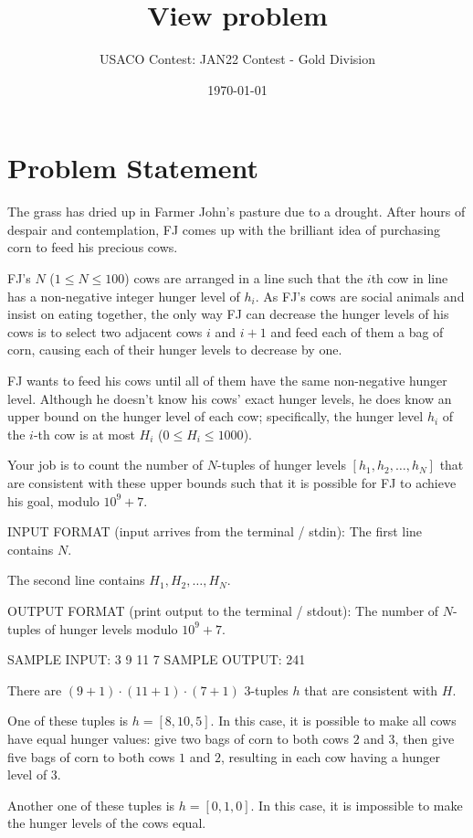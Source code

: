\documentclass[12pt]{article}
\title{View problem}
\author{USACO Contest: JAN22 Contest - Gold Division}
\date{\today}
\begin{document}
\maketitle

\section*{Problem Statement}

The grass has dried up in Farmer John's pasture due to a drought. After hours of
despair and contemplation, FJ comes up with the brilliant idea of purchasing
corn to feed his precious cows.

FJ’s $N$ ($1 \leq N \leq 100$) cows are arranged in a line such that the $i$th
cow in line has a non-negative integer hunger level of $h_i$. As FJ’s cows are
social animals and insist on eating together, the only way FJ can decrease the
hunger levels of his cows is to select two adjacent cows $i$ and $i+1$ and feed
each of them a bag of corn, causing each of their hunger levels to decrease by
one. 

FJ wants to feed his cows until all of them have the same non-negative hunger
level. Although he doesn't know his cows' exact hunger levels, he
does know an upper bound on the hunger level of each cow; specifically, the
hunger level $h_i$ of the $i$-th cow is at most $H_i$ ($0\le H_i\le 1000$). 

Your job is to count the number of $N$-tuples of hunger levels
$[h_1,h_2,\ldots,h_N]$ that are consistent with these upper bounds such that it
is possible for FJ to achieve his goal, modulo $10^9+7$.

INPUT FORMAT (input arrives from the terminal / stdin):
The first line contains $N$.

The second line contains $H_1,H_2,\ldots,H_N$.


OUTPUT FORMAT (print output to the terminal / stdout):
The number of $N$-tuples of hunger levels modulo $10^9+7$.

SAMPLE INPUT:
3
9 11 7
SAMPLE OUTPUT: 
241

There are $(9+1)\cdot (11+1)\cdot (7+1)$ $3$-tuples $h$ that are consistent with
$H$.

One of these tuples is $h=[8,10,5]$. In this case, it is possible to make all
cows have equal hunger values: give two bags of corn to both cows $2$ and $3$,
then  give five bags of corn to both cows $1$ and $2$, resulting in each cow
having  a hunger level of $3$.

Another one of these tuples is $h=[0,1,0]$. In this case, it is impossible to 
make the hunger levels of the cows equal.
\end{document}

